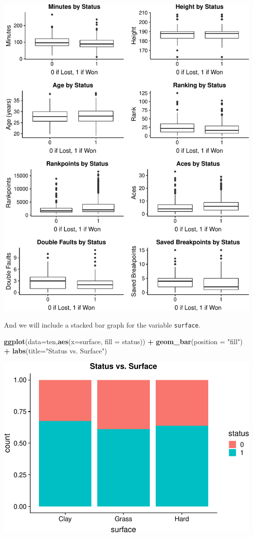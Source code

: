 \documentclass[]{article}
\newenvironment{Shaded}{\begin{snugshade}}{\end{snugshade}}
\newcommand{\DataTypeTok}[1]{\textcolor[rgb]{0.13,0.29,0.53}{#1}}
\newcommand{\KeywordTok}[1]{\textcolor[rgb]{0.13,0.29,0.53}{\textbf{#1}}}
\newcommand{\NormalTok}[1]{#1}
\newcommand{\OperatorTok}[1]{\textcolor[rgb]{0.81,0.36,0.00}{\textbf{#1}}}
\newcommand{\StringTok}[1]{\textcolor[rgb]{0.31,0.60,0.02}{#1}}
\begin{document}
\includegraphics{Project_files/figure-latex/unnamed-chunk-6-1.pdf}

And we will include a stacked bar graph for the variable
\texttt{surface}.

\begin{Shaded}
\begin{Highlighting}[]
\KeywordTok{ggplot}\NormalTok{(}\DataTypeTok{data=}\NormalTok{ten,}\KeywordTok{aes}\NormalTok{(}\DataTypeTok{x=}\NormalTok{surface, }\DataTypeTok{fill =}\NormalTok{ status)) }\OperatorTok{+}\StringTok{ }\KeywordTok{geom_bar}\NormalTok{(}\DataTypeTok{position =} \StringTok{"fill"}\NormalTok{) }\OperatorTok{+}\StringTok{ }
\StringTok{  }\KeywordTok{labs}\NormalTok{(}\DataTypeTok{title=}\StringTok{"Status vs. Surface"}\NormalTok{)}
\end{Highlighting}
\end{Shaded}

\includegraphics{Project_files/figure-latex/unnamed-chunk-7-1.pdf}
\end{document}
